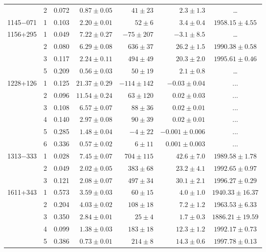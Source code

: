 \begin{table}[tbh!]
\begin{SingleSpace}
\begin{tabular}{l c r r r r c}
         &  2 &  0.072 & $ 0.87\pm 0.05$ & $  41\pm  23$ & $  2.3\pm 1.3$ & \dots \\
1145$-$071 &  1 &  0.103 & $ 2.20\pm 0.01$ & $  52\pm   6$ & $  3.4\pm 0.4$ & $1958.15\pm   4.55$ \\
1156+295 &  1 &  0.049 & $ 7.22\pm 0.27$ & $ -75\pm 207$ & $ -3.1\pm 8.5$ & \dots \\
         &  2 &  0.080 & $ 6.29\pm 0.08$ & $ 636\pm  37$ & $ 26.2\pm 1.5$ & $1990.38\pm   0.58$ \\
         &  3 &  0.117 & $ 2.24\pm 0.11$ & $ 494\pm  49$ & $ 20.3\pm 2.0$ & $1995.61\pm   0.46$ \\
         &  5 &  0.209 & $ 0.56\pm 0.03$ & $  50\pm  19$ & $  2.1\pm 0.8$ & \dots \\
1228+126 &  1 &  0.125 & $21.37\pm 0.29$ & $-114\pm 142$ & $ -0.03\pm 0.04$ &  ... \\
         &  2 &  0.096 & $11.54\pm 0.24$ & $  63\pm 120$ & $  0.02\pm 0.03$ & ... \\
         &  3 &  0.108 & $ 6.57\pm 0.07$ & $  88\pm  36$ & $  0.02\pm 0.01$ & ... \\
         &  4 &  0.140 & $ 2.97\pm 0.08$ & $  90\pm  39$ & $  0.02\pm 0.01$ & ... \\
         &  5 &  0.285 & $ 1.48\pm 0.04$ & $  -4\pm  22$ & $ -0.001\pm 0.006$ &  ... \\
         &  6 &  0.336 & $ 0.57\pm 0.02$ & $   6\pm  11$ & $  0.001\pm 0.003$ &  ... \\
1313$-$333 &  1 &  0.028 & $ 7.45\pm 0.07$ & $ 704\pm 115$ & $ 42.6\pm 7.0$ & $1989.58\pm   1.78$ \\
         &  2 &  0.049 & $ 2.02\pm 0.05$ & $ 383\pm  68$ & $ 23.2\pm 4.1$ & $1992.65\pm   0.97$ \\
         &  3 &  0.121 & $ 2.08\pm 0.07$ & $ 497\pm  34$ & $ 30.1\pm 2.1$ & $1996.27\pm   0.29$ \\
1611+343 &  1 &  0.573 & $ 3.59\pm 0.03$ & $  60\pm  15$ & $  4.0\pm 1.0$ & $1940.33\pm  16.37$ \\
         &  2 &  0.204 & $ 4.03\pm 0.02$ & $ 108\pm  18$ & $  7.2\pm 1.2$ & $1963.53\pm   6.33$ \\
         &  3 &  0.350 & $ 2.84\pm 0.01$ & $  25\pm   4$ & $  1.7\pm 0.3$ & $1886.21\pm  19.59$ \\
         &  4 &  0.099 & $ 1.38\pm 0.03$ & $ 183\pm  18$ & $ 12.3\pm 1.2$ & $1992.17\pm   0.73$ \\
         &  5 &  0.386 & $ 0.73\pm 0.01$ & $ 214\pm   8$ & $ 14.3\pm 0.6$ & $1997.78\pm   0.13$ \\

\end{tabular}
\end{SingleSpace}
\end{table}
